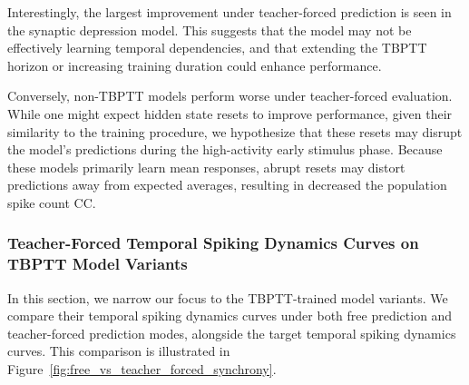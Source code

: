 Interestingly, the largest improvement under teacher-forced prediction is seen in the synaptic depression model. This suggests that the model may not be effectively learning temporal dependencies, and that extending the TBPTT horizon or increasing training duration could enhance performance.

Conversely, non-TBPTT models perform worse under teacher-forced evaluation. While one might expect hidden state resets to improve performance, given their similarity to the training procedure, we hypothesize that these resets may disrupt the model's predictions during the high-activity early stimulus phase. Because these models primarily learn mean responses, abrupt resets may distort predictions away from expected averages, resulting in decreased the population spike count CC.


\subsubsection{Teacher-Forced Temporal Spiking Dynamics Curves on TBPTT Model Variants}
\label{subsubsec:teacher_forced_synchrony_curves_tbptt}
In this section, we narrow our focus to the TBPTT-trained model variants. We compare their temporal spiking dynamics curves under both free prediction and teacher-forced prediction modes, alongside the target temporal spiking dynamics curves. This comparison is illustrated in Figure~\ref{fig:free_vs_teacher_forced_synchrony}.

